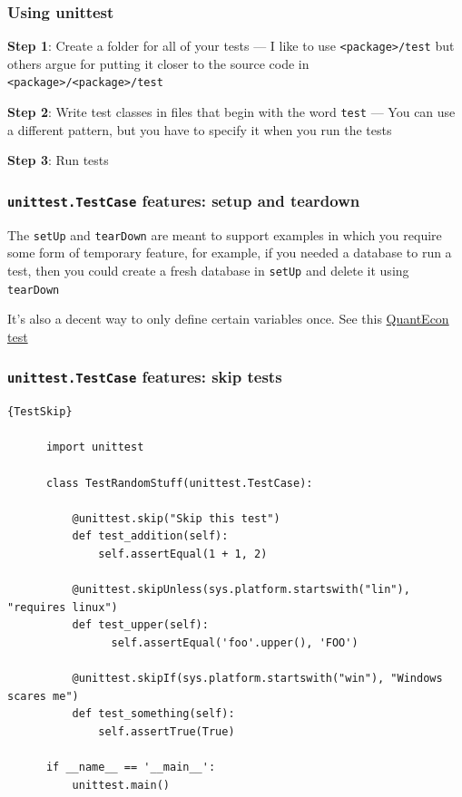 \documentclass[10pt]{beamer}
\begin{document}
  \begin{frame} \frametitle{Using unittest}

    \textbf{Step 1}: Create a folder for all of your tests --- I like to use
    \texttt{<package>/test} but others argue for putting it closer to the source code
    in \texttt{<package>/<package>/test}

    \vspace{0.25cm}

    \textbf{Step 2}: Write test classes in files that begin with the word \texttt{test}
    --- You can use a different pattern, but you have to specify it when you run the
    tests

    \vspace{0.25cm}

    \textbf{Step 3}: Run tests

  \end{frame}

  \begin{frame} \frametitle{\texttt{unittest.TestCase} features: setup and teardown}

    The \texttt{setUp} and \texttt{tearDown} are meant to support examples in which you
    require some form of temporary feature, for example, if you needed a database to run
    a test, then you could create a fresh database in \texttt{setUp} and delete it using
    \texttt{tearDown}

    \vspace{0.25cm}

    It's also a decent way to only define certain variables once. See this
    \href{https://github.com/QuantEcon/QuantEcon.py/blob/master/quantecon/tests/test_lqcontrol.py}{QuantEcon test}

  \end{frame}

  \begin{frame}[fragile] \frametitle{\texttt{unittest.TestCase} features: skip tests}

      \begin{lstlisting}{TestSkip}

      import unittest

      class TestRandomStuff(unittest.TestCase):

          @unittest.skip("Skip this test")
          def test_addition(self):
              self.assertEqual(1 + 1, 2)

          @unittest.skipUnless(sys.platform.startswith("lin"), "requires linux")
          def test_upper(self):
                self.assertEqual('foo'.upper(), 'FOO')

          @unittest.skipIf(sys.platform.startswith("win"), "Windows scares me")
          def test_something(self):
              self.assertTrue(True)

      if __name__ == '__main__':
          unittest.main()
      \end{lstlisting}

  \end{frame}
\end{document}
